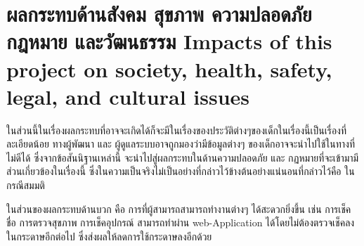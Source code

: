 \section{\ifcpe%
ผลกระทบด้านสังคม สุขภาพ ความปลอดภัย กฎหมาย และวัฒนธรรม
\else%
Impacts of this project on society, health, safety, legal, and cultural issues
\fi}

ในส่วนนี้ในเรื่องผลกระทบที่อาจจะเกิดได้ก็จะมีในเรื่องของประวัติต่างๆของเด็กในเรื่องนี้เป็นเรื่องที่ละเอียดน้อย ทางผู้พัฒนา และ ผู้ดูแลระบบอาจถูกมองว่ามีข้อมูลต่างๆ ของเด็กอาจจะนำไปใช้ในทางที่ไม่ดีได้  ซึ่งจากข้อสันนิฐานเหล่านี้ จะนำไปสู่ผลกระทบในด้านความปลอดภัย และ กฏหมายที่จะเข้ามามีส่วนเกี่ยวข้องในเรื่องนี้ ซึ่งในความเป็นจริงไม่เป็นอย่างที่กล่าวไว้ข้างต้นอย่างแน่นอนที่กล่าวไว้คือ ในกรณีสมมติ 

ในส่วนของผลกระทบด้านบวก คือ การที่ผู้สามารถสามารถทำงานต่างๆ ได้สะดวกยิ่งขึ้น เช่น การเช็คชื่อ การตรวจสุขภาพ การเช็คอุปกรณ์ สามารถทำผ่าน web-Application ได้โดยไม่ต้องตรวจเช็คลงในกระดาษอีกต่อไป ซึ่งส่งผลให้ลดการใช้กระดาษลงอีกด้วย

